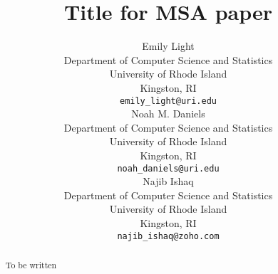 \documentclass{article}
\begin{document}
\title{Title for MSA paper}



\author{
    Emily Light \\
    Department of Computer Science and Statistics\\
    University of Rhode Island\\
    Kingston, RI\\
    \texttt{emily\_light@uri.edu} \\
    \And
    Noah M. Daniels \\
    Department of Computer Science and Statistics\\
    University of Rhode Island\\
    Kingston, RI\\
    \texttt{noah\_daniels@uri.edu} \\
    \And
    Najib Ishaq \\
    Department of Computer Science and Statistics\\
    University of Rhode Island\\
    Kingston, RI\\
    \texttt{najib\_ishaq@zoho.com} \\
}

\maketitle

\begin{abstract}
    To be written
\end{abstract}









\end{document}
